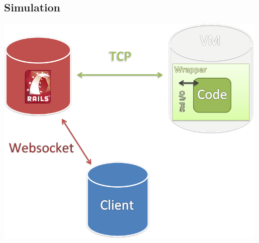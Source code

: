 \subsection{Simulation}




\begin{frame}
\begin{center}
	\includegraphics[scale=0.35]{overview}
\end{center}
\end{frame}




